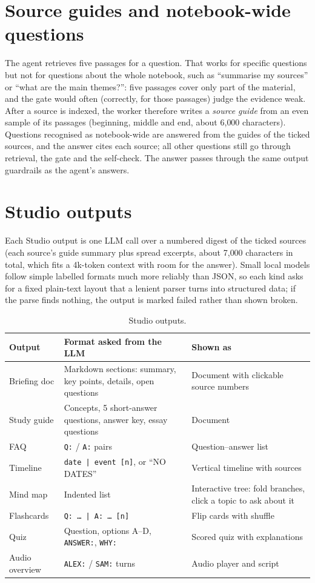 \section{Source guides and notebook-wide questions}\label{sec:overview}
The agent retrieves five passages for a question. That works for specific questions but not for questions about the whole notebook, such as ``summarise my sources'' or ``what are the main themes?'': five passages cover only part of the material, and the gate would often (correctly, for those passages) judge the evidence weak. After a source is indexed, the worker therefore writes a \emph{source guide} from an even sample of its passages (beginning, middle and end, about 6{,}000 characters). Questions recognised as notebook-wide are answered from the guides of the ticked sources, and the answer cites each source; all other questions still go through retrieval, the gate and the self-check. The answer passes through the same output guardrails as the agent's answers.

\section{Studio outputs}
Each Studio output is one LLM call over a numbered digest of the ticked sources (each source's guide summary plus spread excerpts, about 7{,}000 characters in total, which fits a 4k-token context with room for the answer). Small local models follow simple labelled formats much more reliably than JSON, so each kind asks for a fixed plain-text layout that a lenient parser turns into structured data; if the parse finds nothing, the output is marked failed rather than shown broken.

\begin{table}[H]
\centering\small
\begin{tabularx}{\textwidth}{@{}p{2.5cm}p{5.2cm}Y@{}}
\toprule
Output & Format asked from the LLM & Shown as \\
\midrule
Briefing doc & Markdown sections: summary, key points, details, open questions & Document with clickable source numbers \\
Study guide & Concepts, 5 short-answer questions, answer key, essay questions & Document \\
FAQ & \texttt{Q:} / \texttt{A:} pairs & Question--answer list \\
Timeline & \texttt{date | event [n]}, or ``NO DATES'' & Vertical timeline with sources \\
Mind map & Indented list & Interactive tree: fold branches, click a topic to ask about it \\
Flashcards & \texttt{Q: \ldots{} | A: \ldots{} [n]} & Flip cards with shuffle \\
Quiz & Question, options A--D, \texttt{ANSWER:}, \texttt{WHY:} & Scored quiz with explanations \\
Audio overview & \texttt{ALEX:} / \texttt{SAM:} turns & Audio player and script \\
\bottomrule
\end{tabularx}
\caption{Studio outputs.}
\label{tab:studio}
\end{table}

